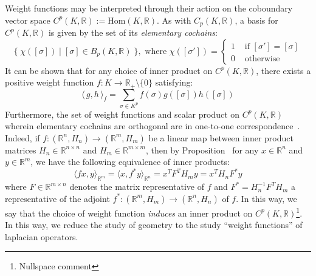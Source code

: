 \documentclass[10pt]{article}
\numberwithin{equation}{section}
\newcommand{\+}{%
	\raisebox{0.18ex}{\scaleobj{0.55}{+}}
}
\theoremstyle{definition}
\theoremstyle{definition}
\begin{document}
Weight functions may be interpreted through their action on the coboundary vector space $C^p(K, \mathbb{R}) := \mathrm{Hom}(K, \mathbb{R})$.
As with $C_p(K, \mathbb{R})$, a basis for $C^p(K, \mathbb{R})$ is given by the set of its \emph{elementary cochains}:
\begin{equation}
	\{ \; \chi([\sigma]) \mid [\sigma] \in B_p(K, \mathbb{R}) \; \}, \text{ where } \chi([\sigma']) = \begin{cases}
		1 & \text{ if } [\sigma'] = [\sigma] \\
		0 & \text{ otherwise }
		\end{cases}
\end{equation}
It can be shown that for any choice of inner product on $C^p(K, \mathbb{R})$, there exists a positive weight function $f: K \to \mathbb{R}_+ \setminus \{0\}$ satisfying: 
\begin{equation}
	\langle \, g, h \, \rangle_{f} = \sum\limits_{\sigma \in K^p} f(\sigma) g([\sigma]) h([\sigma])
\end{equation}
Furthermore, the set of weight functions and scalar product on $C^p(K, \mathbb{R})$ wherein elementary cochains are orthogonal are in one-to-one correspondence~\cite{}. 
 Indeed, if $f : (\mathbb{R}^n, H_n) \to (\mathbb{R}^m, H_m)$ be a linear map between inner product matrices $H_n \in \mathbb{R}^{n \times n}$ and $H_m \in \mathbb{R}^{m \times m}$, then by Proposition~\cite{} for any $x \in \mathbb{R}^n$ and $y \in \mathbb{R}^m$, we have the following equivalence of inner products: 
	$$ \langle f x, y \rangle_{\mathbb{R}^m}  = \langle x, f^\ast y \rangle_{\mathbb{R}^n} = x^T F^T H_m y = x^T H_n F^\ast y $$
	where $F \in \mathbb{R}^{m \times n}$ denotes the matrix representative of $f$ and $F^\ast = H_n^{-1} F^T H_m$ a representative of the adjoint $f^\ast : (\mathbb{R}^m, H_m) \to (\mathbb{R}^n, H_n)$ of $f$. 
	 In this way, we say that the choice of weight function \emph{induces} an inner product on $C^p(K, \mathbb{R})$\footnote{Nullspace comment}. 
In this way, we reduce the study of geometry to the study ``weight functions'' of laplacian operators. 
\end{document}
